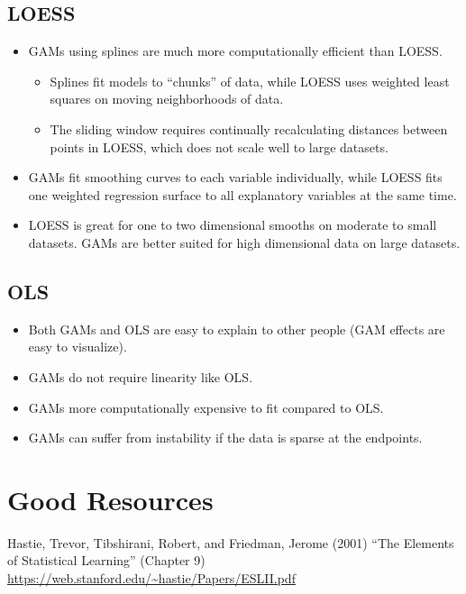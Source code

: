 \documentclass[12pt]{../notes}
\begin{document}
\subsection{LOESS}
\begin{itemize}
\item GAMs using splines are much more computationally efficient than LOESS. 
\begin{itemize}
\item Splines fit models to ``chunks'' of data, while LOESS uses weighted least squares on moving neighborhoods of data. 
\item The sliding window requires continually recalculating distances between points in LOESS, which does not scale well to large datasets. 
\end{itemize}
\item GAMs fit smoothing curves to each variable individually, while LOESS fits one weighted regression surface to all explanatory variables at the same time. 
\item LOESS is great for one to two dimensional smooths on moderate to small datasets. GAMs are better suited for high dimensional data on large datasets. 
\end{itemize}

\subsection{OLS}
\begin{itemize}
\item Both GAMs and OLS are easy to explain to other people (GAM effects are easy to visualize). 
\item GAMs do not require linearity like OLS. 
\item GAMs more computationally expensive to fit compared to OLS. 
\item GAMs can suffer from instability if the data is sparse at the endpoints. 
\end{itemize}


\section{Good Resources}
\bi
\item Hastie, Trevor, Tibshirani, Robert, and Friedman, Jerome (2001) “The Elements of Statistical Learning” (Chapter 9) \url{https://web.stanford.edu/~hastie/Papers/ESLII.pdf}
\ei
\end{document}
